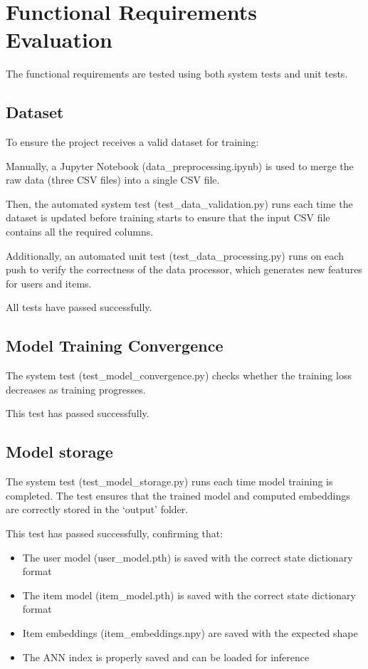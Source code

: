 \documentclass[12pt, titlepage]{article}
\begin{document}
\section{Functional Requirements Evaluation}

The functional requirements are tested using both system tests and unit tests.

\subsection{Dataset}

To ensure the project receives a valid dataset for training:

Manually, a Jupyter Notebook (data\_preprocessing.ipynb) is used to merge the raw data (three CSV files) into a single CSV file. 

Then, the automated system test (test\_data\_validation.py) runs each time the dataset is updated before training starts to ensure that the input CSV file contains all the required columns.

Additionally, an automated unit test (test\_data\_processing.py) runs on each push to verify the correctness of the data processor, which generates new features for users and items.

All tests have passed successfully.

\subsection{Model Training Convergence}
The system test (test\_model\_convergence.py) checks whether the training loss decreases as training progresses. 

This test has passed successfully. 

\subsection{Model storage}


The system test (test\_model\_storage.py) runs each time model training is completed. The test ensures that the trained model and computed embeddings are correctly stored in the `output' folder.

This test has passed successfully, confirming that:
\begin{itemize}
    \item The user model (user\_model.pth) is saved with the correct state dictionary format
    \item The item model (item\_model.pth) is saved with the correct state dictionary format
    \item Item embeddings (item\_embeddings.npy) are saved with the expected shape
    \item The ANN index is properly saved and can be loaded for inference
\end{itemize}
\end{document}
